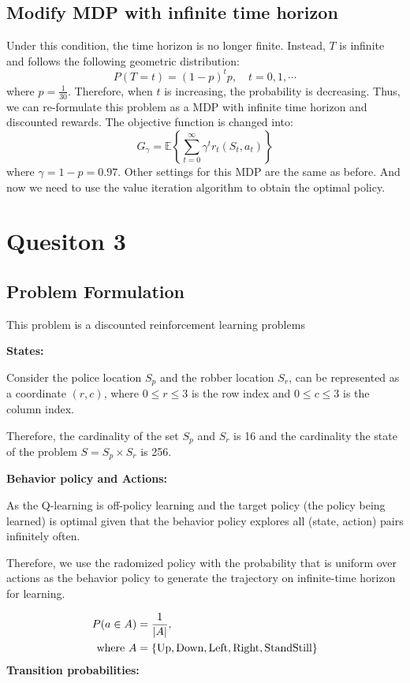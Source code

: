 \documentclass{article}
\begin{document}
\subsection{Modify MDP with infinite time horizon}
Under this condition, the time horizon is no longer finite. Instead, $T$ is infinite and follows the following geometric distribution:
$$P(T=t)=(1-p)^tp, \quad t=0,1,\cdots$$
where $p=\frac{1}{30}$. Therefore, when $t$ is increasing, the probability is decreasing.
Thus, we can re-formulate this problem as a MDP with infinite time horizon and discounted rewards. The objective function is changed into:
$$G_{\gamma}=\mathbb{E}\left\{\sum_{t=0}^{\infty}\gamma^t r_t(S_t,a_t)\right\}$$
where $\gamma=1-p=0.97$.
Other settings for this MDP are the same as before. And now we need to use the value iteration algorithm to obtain the optimal policy.


\section{Quesiton 3}
\subsection{Problem Formulation}

This problem is a discounted reinforcement learning problems

\textbf{States:}

Consider the police location $S_p$ and the robber location $S_r$, can be represented
as a coordinate $(r, c)$, where $0 \leq r \leq 3$ is the row index and $0 \leq c \leq 3$
is the column index.

Therefore, the cardinality of the set $S_p$ and $S_r$ is 16 and
the cardinality the state of the problem $S = S_p \times S_r$ is 256.

\vspace{0.3cm}

\textbf{Behavior policy and Actions:}

As the Q-learning is off-policy learning and the target policy (the policy being
learned) is optimal given that the behavior policy explores all (state, action) pairs
infinitely often.

Therefore, we use the radomized policy with the probability that is uniform
over actions as the behavior policy to generate the trajectory on infinite-time
horizon for learning.

\begin{align*}
  P(a \in A) &= \frac{1}{|A|}, \\
  \text{where} ~
  A &= \{\textup{Up},\textup{Down},\textup{Left},\textup{Right},\textup{StandStill}\}
\end{align*}
\textbf{Transition probabilities:}
\end{document}
